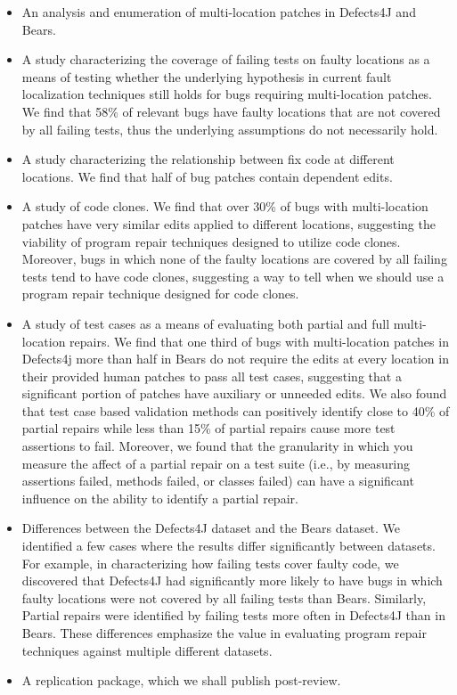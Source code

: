 \documentclass[sigconf, timestamp-false, anonymous=true]{acmart}
\begin{document}
\begin{itemize}
\item An analysis and enumeration of multi-location patches in Defects4J and Bears.
\item A study characterizing the coverage of failing tests on faulty locations
  as a means of testing whether the underlying hypothesis in current fault
  localization techniques still holds for bugs requiring multi-location
  patches. We find that 58\% of relevant bugs have faulty locations that are not
  covered by all failing tests, thus the underlying assumptions do not
  necessarily hold.
\item A study characterizing the relationship between fix code at different locations.  We 
find that half of bug patches contain dependent edits.
\item A study of code clones. We find that over 30\% of bugs with multi-location
patches have very similar edits applied to different locations, suggesting the viability of 
program repair techniques designed to utilize code clones. Moreover, bugs in which 
none of the faulty locations are covered by all failing tests tend to have code clones, 
suggesting a way to tell when we should use a program repair technique designed for code 
clones.
\item A study of test cases as a means of evaluating both partial and full
  multi-location repairs.  We find that one third of bugs with multi-location
  patches in Defects4j more than half in Bears do not require the edits at every
  location in their provided human patches to pass all test cases, suggesting that a 
  significant portion of patches have auxiliary or unneeded edits. We also found that test 
  case based validation methods can positively identify close to 40\% of partial repairs
  while less than
  15\% of partial repairs cause more test assertions to fail. Moreover, we found that the 
  granularity in which you measure the affect of a partial repair on a test suite (i.e., by 
  measuring assertions failed, methods failed, or classes failed) can have a significant 
  influence on the ability to identify a partial repair.
\item Differences between the Defects4J dataset and the Bears dataset. We identified a 
few cases where the results differ significantly between datasets. For example, in 
characterizing how failing tests cover faulty code, we discovered that Defects4J had 
significantly more likely to have bugs in which faulty locations were not covered by all 
failing tests than Bears. Similarly, Partial repairs were identified by failing tests more often 
in Defects4J than in Bears. These differences emphasize the value in evaluating program 
repair techniques against multiple different datasets.
\item A replication package, which we shall publish post-review.
\end{itemize}
\end{document}
